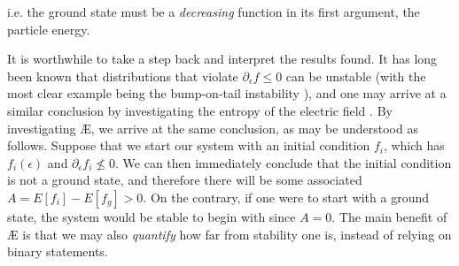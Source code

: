 i.e. the ground state must be a \textit{decreasing} function in its first argument, the particle energy. \par 
It is worthwhile to take a step back and interpret the results found. It has long been known that distributions that violate $\partial_\epsilon f \leq 0$ can be unstable \cite{taylor1963some} (with the most clear example being the bump-on-tail instability \cite{drtjmmond1962non}), and one may arrive at a similar conclusion by investigating the entropy of the electric field \cite{minardi1985thermodynamics}. By investigating \AE{}, we arrive at the same conclusion, as may be understood as follows. Suppose that we start our system with an initial condition $f_i$, which has $f_i(\epsilon)$ and $\partial_\epsilon f_i \nleq 0$. We can then immediately conclude that the initial condition is not a ground state, and therefore there will be some associated $A = E[f_i] - E[f_g]>0$. On the contrary, if one were to start with a ground state, the system would be stable to begin with since $A=0$. The main benefit of \AE{} is that we may also \textit{quantify} how far from stability one is, instead of relying on binary statements. 

